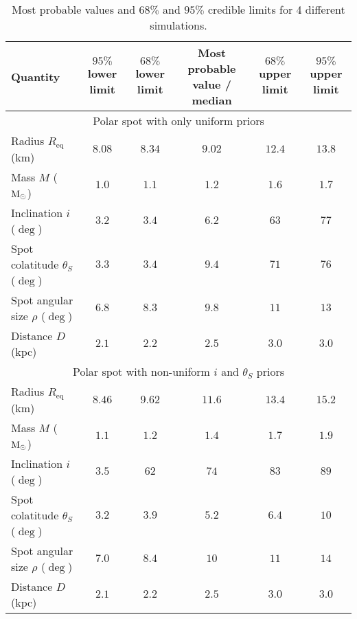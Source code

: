 \documentclass{wihuri}
\def\msun{{\rm M_{\odot}}}
\def\thetas{\theta_{S}}
\def\req{R_{\mathrm{eq}}}
\begin{document}
\begin{center}
\begin{table*}
  \caption{Most probable values and $68\%$ and $95\%$ credible limits for 4 different simulations.}
\label{table:conflimits}
\begin{footnotesize}
\begin{center}
 \begin{adjustwidth}{-3cm}{}
  \begin{tabular}[c]{l c c c c c}
    \hline
    \hline
      Quantity & $95\%$ lower limit & $68\%$ lower limit & Most probable value / median & $68\%$ upper limit & $95\%$ upper limit \\ \hline
     \multicolumn{6}{c}{Polar spot with only uniform priors} \\ %
      Radius $\req$ (km) & $8.08$ & $8.34$ & $9.02$ & $12.4$ & $13.8$  \\ %
      Mass $M$ ($\msun$) & $1.0$ & $1.1$ & $1.2$ & $1.6$ & $1.7$  \\ %
      Inclination $i$ ($\deg$) & $3.2$ & $3.4$ & $6.2$ & $63$ & $77$ \\ %
      Spot colatitude $\thetas$ ($\deg$) & $3.3$ & $3.4$ & $9.4$ & $71$ & $76$ \\ %
      Spot angular size $\rho$ ($\deg$) & $6.8$ & $8.3$ & $9.8$ & $11$ & $13$ \\ %
      Distance $D$ (kpc) & $2.1$ & $2.2$ & $2.5$ & $3.0$ & $3.0$ \\   \hline
      
      \multicolumn{6}{c}{Polar spot with non-uniform $i$ and $\thetas$ priors} \\ %
      Radius $\req$ (km) & $8.46$ & $9.62$ & $11.6$ & $13.4$ & $15.2$  \\ %
      Mass $M$ ($\msun$) & $1.1$ & $1.2$ & $1.4$ & $1.7$ & $1.9$  \\ %
      Inclination $i$ ($\deg$) & $3.5$ & $62$ & $74$ & $83$ & $89$ \\ %
      Spot colatitude $\thetas$ ($\deg$) & $3.2$ & $3.9$ & $5.2$ & $6.4$ & $10$ \\ %
      Spot angular size $\rho$ ($\deg$) & $7.0$ & $8.4$ & $10$ & $11$ & $14$ \\ %
      Distance $D$ (kpc) & $2.1$ & $2.2$ & $2.5$ & $3.0$ & $3.0$ \\ \hline
      

\end{tabular}
\end{adjustwidth}
\end{center}
\end{footnotesize}
\end{table*}
\end{center}
\end{document}
